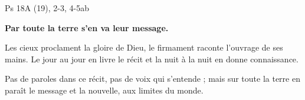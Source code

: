 Ps 18A (19), 2-3, 4-5ab

\textbf{Par toute la terre s’en va leur message.}

\smallskip

Les cieux proclament la gloire de Dieu,
le firmament raconte l’ouvrage de ses mains.
Le jour au jour en livre le récit
et la nuit à la nuit en donne connaissance.

\smallskip

Pas de paroles dans ce récit,
pas de voix qui s’entende ;
mais sur toute la terre en paraît le message
et la nouvelle, aux limites du monde.
